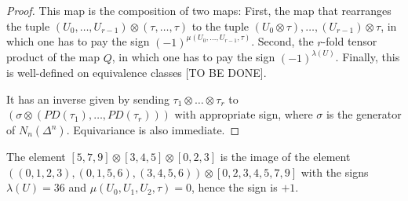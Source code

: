 \begin{proof} This map is the composition of two maps: First, the map that rearranges the tuple $(U_0,\ldots,U_{r-1})\otimes (\tau,\ldots,\tau)$ to the tuple $(U_0\otimes \tau),\ldots,(U_{r-1})\otimes \tau$, in which one has to pay the sign $(-1)^{\mu(U_0,\ldots,U_{r-1},\tau)}$. Second, the $r$-fold tensor product of the map $Q$, in which one has to pay the sign $(-1)^{\lambda(U)}$. Finally, this is well-defined on equivalence classes [TO BE DONE].

It has an inverse given by sending $\tau_1\otimes\ldots \otimes \tau_r$ to $(\sigma\otimes (PD(\tau_1),\ldots,PD(\tau_r)))$ with appropriate sign, where $\sigma$ is the generator of $N_n(\Delta^n)$. Equivariance is also immediate.
\end{proof}
\begin{example}\label{ex:102}
    The element $[5,7,9]\otimes [3,4,5]\otimes [0,2,3]$ is the image of the element $((0,1,2,3),(0,1,5,6),(3,4,5,6))\otimes [0,2,3,4,5,7,9]$ with the signs $\lambda(U) = 36$ and $\mu(U_0,U_1,U_2,\tau) = 0$, hence the sign is $+1$.
\end{example}





